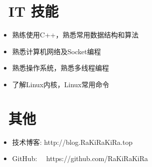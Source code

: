 \documentclass{resume}
\begin{document}
\section{\faCogs\ IT 技能}
\begin{itemize}[parsep=0.5ex]
  \item 熟练使用C++，熟悉常用数据结构和算法
  \item 熟悉计算机网络及Socket编程
  \item 熟悉操作系统，熟悉多线程编程
  \item 了解Linux内核，Linux常用命令
\end{itemize}


\section{\faInfo\ 其他}
\begin{itemize}[parsep=0.5ex]
  \item 技术博客: http://blog.RaKiRaKiRa.top
  \item GitHub:  \,\,\, \,https://github.com/RaKiRaKiRa
\end{itemize}

%
%
\end{document}
